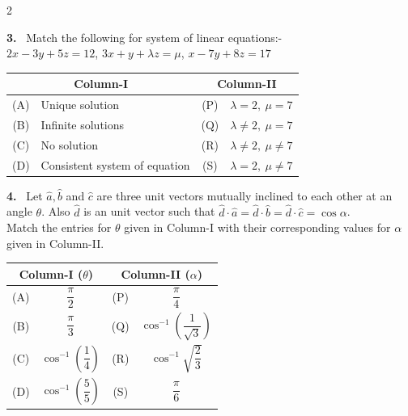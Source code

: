 \documentclass[10pt]{extarticle}
\newcommand{\qn}[1]{\par\smallskip\noindent\textbf{#1.}~}
\begin{document}
\begin{multicols}{2}
\qn{3} Match the following for system of linear equations:-\\
$2x-3y+5z=12$, $3x+y+\lambda z=\mu$, $x-7y+8z=17$\par\nobreak
\begin{center}\small\setlength{\tabcolsep}{3pt}
\begin{tabular}{|c|p{3.3cm}|c|p{2.3cm}|}
\hline
\multicolumn{2}{|c|}{Column-I} & \multicolumn{2}{c|}{Column-II} \\
\hline
(A) & Unique solution & (P) & $\lambda=2,\ \mu=7$ \\
\hline
(B) & Infinite solutions & (Q) & $\lambda\ne2,\ \mu=7$ \\
\hline
(C) & No solution & (R) & $\lambda\ne2,\ \mu\ne7$ \\
\hline
(D) & Consistent system of equation & (S) & $\lambda=2,\ \mu\ne7$ \\
\hline
\end{tabular}
\end{center}

\qn{4} Let $\hat a,\hat b$ and $\hat c$ are three unit vectors mutually inclined to each other at an angle $\theta$. Also $\hat d$ is an unit vector such that $\hat d\cdot\hat a=\hat d\cdot\hat b=\hat d\cdot\hat c=\cos\alpha$.\\
Match the entries for $\theta$ given in Column-I with their corresponding values for $\alpha$ given in Column-II.\par\nobreak
\begin{center}\small\setlength{\tabcolsep}{3pt}
\begin{tabular}{|c|c|c|c|}
\hline
\multicolumn{2}{|c|}{Column-I ($\theta$)} & \multicolumn{2}{c|}{Column-II ($\alpha$)} \\
\hline
(A) & $\dfrac\pi2$ & (P) & $\dfrac\pi4$ \\
\hline
(B) & $\dfrac\pi3$ & (Q) & $\cos^{-1}\left(\dfrac1{\sqrt3}\right)$ \\
\hline
(C) & $\cos^{-1}\left(\dfrac14\right)$ & (R) & $\cos^{-1}\sqrt{\dfrac23}$ \\
\hline
(D) & $\cos^{-1}\left(\dfrac55\right)$ & (S) & $\dfrac\pi6$ \\
\hline
\end{tabular}
\end{center}


\end{multicols}
\end{document}
